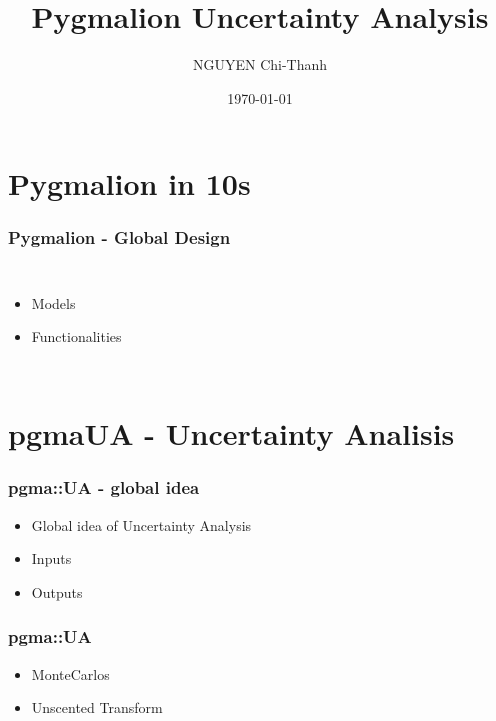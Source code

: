 \documentclass[]{beamer}
\title{Pygmalion Uncertainty Analysis}
\author{NGUYEN Chi-Thanh}
\institute{MAS Central SA}
\date{\today}
\begin{document}
\begin{frame}
  \titlepage 
\end{frame}


\begin{frame}
  \tableofcontents[hideallsubsections]
\end{frame}

\section{Pygmalion in 10s}
\begin{frame}
  \frametitle{Pygmalion - Global Design}
  \begin{columns}[c]
  \column{2in}  %
    \begin{itemize} 
    \item Models
    \item Functionalities
    \end{itemize}
  \column{3in}
  \end{columns} 
\end{frame}
\section{pgmaUA - Uncertainty Analisis}
\begin{frame}
  \frametitle{pgma::UA - global idea}
  \begin{itemize}
  \item<1-> Global idea of Uncertainty Analysis
  \item<2-> Inputs
  \item<3-> Outputs
  \end{itemize}
\end{frame}
\begin{frame}
  \frametitle{pgma::UA}
  \begin{itemize}
  \item MonteCarlos
  \item Unscented Transform
  \end{itemize}
\end{frame}
\end{document}
